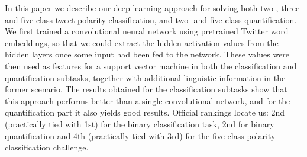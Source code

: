 In this paper we describe our deep learning approach for solving both two-, three- and five-class tweet polarity classification, and two- and five-class quantification. We first trained a convolutional neural network using pretrained Twitter word embeddings, so that we could extract the hidden activation values from the hidden layers once some input had been fed to the network. These values were then used as features for a support vector machine in both the classification and quantification subtasks, together with additional linguistic information in the former scenario. The results obtained for the classification subtasks show that this approach performs better than a single convolutional network, and for the quantification part it also yields good results. Official rankings locate us: 2nd (practically tied with 1st) for the binary classification task, 2nd for binary quantification and 4th (practically tied with 3rd) for the five-class polarity classification challenge.
